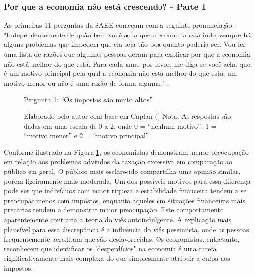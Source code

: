 \subsubsection{Por que a economia não está crescendo? - Parte 1}

As primeiras 11 perguntas da SAEE começam com a seguinte pronunciação: "Independentemente de quão bem você acha que a economia está indo, sempre há alguns problemas que impedem que ela seja tão boa quanto poderia ser. Vou ler uma lista de razões que algumas pessoas deram para explicar por que a economia não está melhor do que está. Para cada uma, por favor, me diga se você acha que é um motivo principal pela qual a economia não está melhor do que está, um motivo menor ou não é uma razão de forma alguma." \cite{saee1996}.

\begin{figure}[H]
    \centering
    \caption*{Pergunta 1: “Os impostos são muito altos”}
    \caption{Elaborado pelo autor com base em Caplan (\citeyear{The_Myth_of_the_Rational_Voter}) \newline
    Nota: As respostas são dadas em uma escala de 0 a 2, onde 0 = “nenhum motivo”, 1 = “motivo menor” e 2 = “motivo principal”.}
    \label{fig:pergunta_1}
\end{figure}


Conforme ilustrado na Figura \ref{fig:pergunta_1}, os economistas demonstram menor preocupação em relação aos problemas advindos da taxação excessiva em comparação ao público em geral. O público mais esclarecido compartilha uma opinião similar, porém ligeiramente mais moderada. Um dos possíveis motivos para essa diferença pode ser que indivíduos com maior riqueza e estabilidade financeira tendem a se preocupar menos com impostos, enquanto aqueles em situações financeiras mais precárias tendem a demonstrar maior preocupação. Este comportamento aparentemente contraria a teoria do viés autoindulgente. A explicação mais plausível para essa discrepância é a influência do viés pessimista, onde as pessoas frequentemente acreditam que são desfavorecidas. Os economistas, entretanto, reconhecem que identificar os "desperdícios" na economia é uma tarefa significativamente mais complexa do que simplesmente atribuir a culpa aos impostos.


